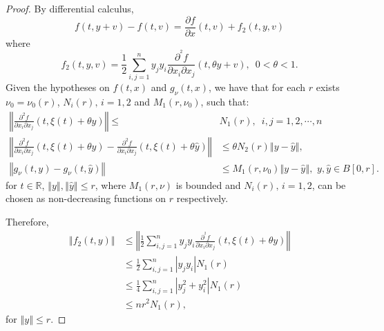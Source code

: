 \documentclass[english,reqno]{amsart}
\numberwithin{equation}{section}
\theoremstyle{plain}
\theoremstyle{definition}
\theoremstyle{remark}
\begin{document}
\begin{proof}
By differential calculus,
\[
f\left(t,y+v\right)-f\left(t,v\right)=\frac{\partial f}{\partial x}\left(t,v\right)+f_{2}\left(t,y,v\right)
\]
where
\begin{equation}
f_{2}\left(t,y,v\right)=\frac{1}{2}\sum_{i,j=1}^{n}y_{j}y_{i}\frac{\partial^{^{2}}f}{\partial x_{i}\partial x_{j}}\left(t,\theta y+v\right),\,\,\,0<\theta<1.\label{eq:taylorsegundoorden}
\end{equation}
Given the hypotheses on $f\left(t,x\right)$ and $g_{\nu}\left(t,x\right)$,
we have that for each $r$ exists $\nu_{0}=\nu_{0}\left(r\right)$,
$N_{i}\left(r\right),\, i=1,2$ and $M_{1}\left(r,\nu_{0}\right)$, such that: 
\begin{align}
\left\Vert \frac{\partial^{2}f}{\partial x_{i}\partial x_{j}}\left(t,\xi\left(t\right)+\theta y\right)\right\Vert \leq & N_{1}\left(r\right),\,\,\, i,j=1,2,\cdots,n\label{eq:segderivadaacotada}\\
\left\Vert \frac{\partial^{2}f}{\partial x_{i}\partial x_{j}}\left(t,\xi\left(t\right)+\theta y\right)-\frac{\partial^{2}f}{\partial x_{i}\partial x_{j}}\left(t,\xi\left(t\right)+\theta\hat{y}\right)\right\Vert  & \leq\theta N_{2}\left(r\right)\left\Vert y-\hat{y}\right\Vert ,\label{eq:Lipschitzsegundaderivada}\\
\left\Vert g_{\nu}\left(t,y\right)-g_{\nu}\left(t,\hat{y}\right)\right\Vert  & \leq M_{1}\left(r,\nu_{0}\right)\left\Vert y-\hat{y}\right\Vert ,\,\, y,\hat{y}\in B\left[0,r\right].
\end{align}
for $t\in\mathbb{R}$, $\left\Vert y\right\Vert ,\left\Vert \hat{y}\right\Vert \leq r$, where $M_{1}\left(r,\nu\right)$ is bounded and $N_{i}\left(r\right),\, i=1,2$, can be chosen as non-decreasing functions on $r$ respectively.

Therefore,
\begin{align}
\left\Vert f_{2}\left(t,y\right)\right\Vert  & \leq\left\Vert \frac{1}{2}\sum_{i,j=1}^{n}y_{j}y_{i}\frac{\partial^{^{2}}f}{\partial x_{i}\partial x_{j}}\left(t,\xi\left(t\right)+\theta y\right)\right\Vert \nonumber \\
 & \leq\frac{1}{2}\sum_{i,j=1}^{n}\left|y_{j}y_{i}\right|N_{1}\left(r\right)\nonumber \\
 & \leq\frac{1}{4}\sum_{i,j=1}^{n}\left|y_{j}^{2}+y_{i}^{2}\right|N_{1}\left(r\right)\nonumber \\
 & \leq nr^{2}N_{1}\left(r\right),\,\,\,\label{eq:cotaf_2}
\end{align}
for $\left\Vert y\right\Vert \leq r$.


\end{proof}
\end{document}
